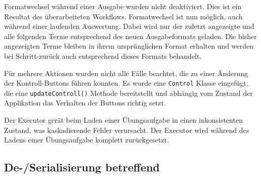 \documentclass[parskip=full,11pt,openany]{scrreprt}
\begin{document}
\begin{itemize}[itemsep=3ex]
	{Formatwechsel während einer Ausgabe wurden nicht deaktiviert. Dies ist ein Resultat des überarbeiteten Workflows.}
	{Formatwechsel ist nun möglich, auch während einer laufenden Auswertung. Dabei wird nur der zuletzt angezeigte und alle folgenden Terme entsprechend des neuen Ausgabeformats geladen. Die bisher angezeigten Terme bleiben in ihrem ursprünglichen 	Format erhalten und werden bei Schritt-zurück auch entsprechend dieses Formats behandelt.}

	{Für mehrere Aktionen wurden nicht alle Fälle beachtet, die zu einer Änderung der Kontroll-Buttons führen konnten.}
	{Es wurde eine \texttt{Control} Klasse eingefügt, die eine \texttt{updateControll()} Methode bereitstellt und abhängig vom Zustand der Applikation das Verhalten der Buttons richtig setzt.}

	{Der Executor gerät beim Laden einer Übungsaufgabe in einen inkonsistenten Zustand, was kaskadierende Fehler verursacht.}
	{Der Executor wird während des Ladens einer Übungsaufgabe komplett zurückgesetzt.}
\end{itemize}

\subsection{De-/Serialisierung betreffend}
\end{document}

